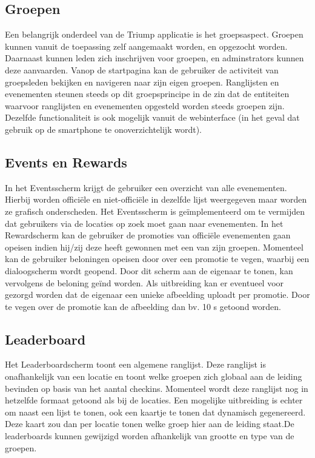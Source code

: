 \subsection{Groepen}%
Een belangrijk onderdeel van de Triump applicatie is het groepsaspect. Groepen kunnen vanuit de toepassing zelf aangemaakt worden, en opgezocht worden. Daarnaast kunnen leden zich inschrijven voor groepen, en adminstrators kunnen deze aanvaarden. Vanop de startpagina kan de gebruiker de activiteit van groepsleden bekijken en navigeren naar zijn eigen groepen. Ranglijsten en evenementen steunen steeds op dit groepsprincipe in de zin dat de entiteiten waarvoor ranglijsten en evenementen opgesteld worden steeds groepen zijn. Dezelfde functionaliteit is ook mogelijk vanuit de webinterface (in het geval dat gebruik op de smartphone te onoverzichtelijk wordt).

\subsection{Events en Rewards}%
In het Eventsscherm krijgt de gebruiker een overzicht van alle evenementen. Hierbij worden officiële en niet-officiële in dezelfde lijst weergegeven maar worden ze grafisch onderscheden. Het Eventsscherm is geïmplementeerd om te vermijden dat gebruikers via de locaties op zoek moet gaan naar evenementen.
In het Rewardscherm kan de gebruiker de promoties van officiële evenementen gaan opeisen indien hij/zij deze heeft gewonnen met een van zijn groepen. Momenteel kan de gebruiker beloningen opeisen door over een promotie te vegen, waarbij een dialoogscherm wordt geopend. Door dit scherm aan de eigenaar te tonen, kan vervolgens de beloning geïnd worden. Als uitbreiding kan er eventueel voor gezorgd worden dat de eigenaar een unieke afbeelding uploadt per promotie. Door te vegen over de promotie kan de afbeelding dan bv. 10 s getoond worden.
\subsection{Leaderboard}%
Het Leaderboardscherm toont een algemene ranglijst. Deze ranglijst is onafhankelijk van een locatie en toont welke groepen zich globaal aan de leiding bevinden op basis van het aantal checkins. Momenteel wordt deze ranglijst nog in hetzelfde formaat getoond als bij de locaties. Een mogelijke uitbreiding is echter om naast een lijst te tonen, ook een kaartje te tonen dat dynamisch gegenereerd. Deze kaart zou dan per locatie tonen welke groep hier aan de leiding staat.De leaderboards kunnen gewijzigd worden afhankelijk van grootte en type van de groepen.
